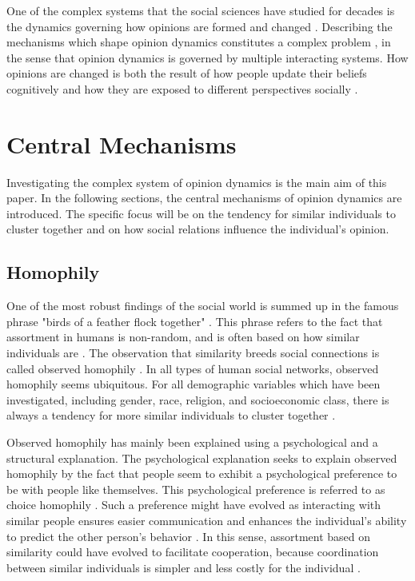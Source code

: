 \documentclass[11pt]{article}
\begin{document}
One of the complex systems that the social sciences have studied for decades is the dynamics governing how opinions are formed and changed \cite{flache_models_2017}. Describing the mechanisms which shape opinion dynamics constitutes a complex problem \cite{mas2019challenges}, in the sense that opinion dynamics is governed by multiple interacting systems. 
How opinions are changed is both the result of how people update their beliefs cognitively and how they are exposed to different perspectives socially \cite{flache_models_2017,friedkin_social_1990,spears_social_2021}. 

\section{Central Mechanisms}
Investigating the complex system of opinion dynamics is the main aim of this paper. In the following sections, the central mechanisms of opinion dynamics are introduced. The specific focus will be on the tendency for similar individuals to cluster together and on how social relations influence the individual's opinion. 

\subsection{Homophily}
One of the most robust findings of the social world is summed up in the famous phrase "birds of a feather flock together" \cite{mcpherson_birds_2001}. This phrase refers to the fact that assortment in humans is non-random, and is often based on how similar individuals are \cite{asikainen_cumulative_2020,crandall_feedback_2008,mcpherson_birds_2001}. The observation that similarity breeds social connections is called observed homophily \cite{mcpherson_birds_2001,kossinets_origins_2009}. In all types of human social networks, observed homophily seems ubiquitous.
For all demographic variables which have been investigated, including gender, race, religion, and socioeconomic class, there is always a tendency for more similar individuals to cluster together \cite{asikainen_cumulative_2020,mcpherson_birds_2001, taylor_exploring_2018}. 

\noindent Observed homophily has mainly been explained using a psychological and a structural explanation. The psychological explanation seeks to explain observed homophily by the fact that people seem to exhibit a psychological preference to be with people like themselves. This psychological preference is referred to as choice homophily \cite{asikainen_cumulative_2020,mcpherson_birds_2001,winter_you_2020}.
Such a preference might have evolved as interacting with similar people ensures easier communication and enhances the individual’s ability to predict the other person’s behavior \cite{kossinets_origins_2009,winter_you_2020}. In this sense, assortment based on similarity could have evolved to facilitate cooperation, because coordination between similar individuals is simpler and less costly for the individual \cite{winter_you_2020,carter2015phenotypic, smaldino2019social}. 
\end{document}
